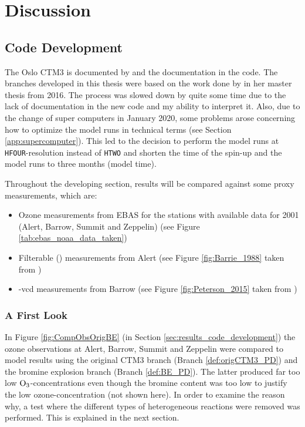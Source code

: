 \setcounter{chapter}{6}
\chapter{Discussion}\label{chap:discussion}

\section{Code Development}\label{sec:discussion_code_development}

The Oslo CTM3 is documented by \cite{SovdeManual} and the documentation in the code. The branches developed in this thesis were based on the work done by \cite{Susanne} in her master thesis from 2016. The process was slowed down by quite some time due to the lack of documentation in the new code and my ability to interpret it. Also, due to the change of super computers in January 2020, some problems arose concerning how to optimize the model runs in technical terms (see Section \ref{app:supercomputer}). This led to the decision to perform the model runs at \texttt{HFOUR}-resolution instead of \texttt{HTWO} and shorten the time of the spin-up and the model runs to three months (model time). 

\medskip

Throughout the developing section, results will be compared against some proxy measurements, which are: 

\begin{itemize}
    \item Ozone measurements from EBAS for the stations with available data for 2001 (Alert, Barrow, Summit and Zeppelin) (see Figure \ref{tab:ebas_noaa_data_taken})
    \item Filterable  () measurements from Alert (see Figure \ref{fig:Barrie_1988} taken from \cite{barrie})
    \item {}-\acrlong{vcd} measurements from Barrow (see Figure \ref{fig:Peterson_2015} taken from \cite{Peterson2015})
\end{itemize}

\subsection{A First Look}

In Figure \ref{fig:CompObsOrigBE} (in Section \ref{sec:results_code_development}) the ozone observations at Alert, Barrow, Summit and Zeppelin were compared to model results using the original CTM3 branch (Branch \ref{def:origCTM3_PD}) and the bromine explosion branch (Branch \ref{def:BE_PD}). The latter produced far too low $\mathrm{O_3}$-concentrations even though the bromine content was too low to justify the low ozone-concentration (not shown here). In order to examine the reason why, a test where the different types of heterogeneous reactions were removed was performed. This is explained in the next section. 

